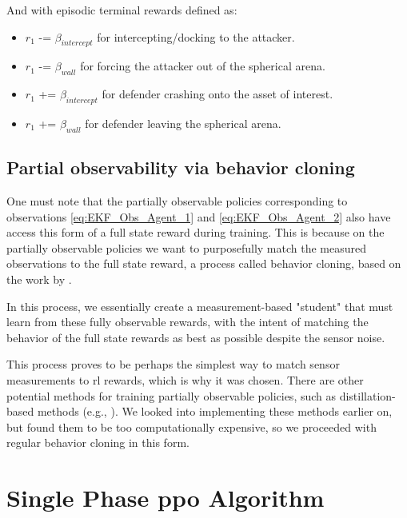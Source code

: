 And with episodic terminal rewards defined as:

\begin{itemize}
    \item $r_1$ -= $\beta_{intercept}$ for intercepting/docking to the attacker.
    \item $r_1$ -= $\beta_{wall}$ for forcing the attacker out of the spherical arena.
    \item $r_1$ += $\beta_{intercept}$ for defender crashing onto the asset of interest.
    \item $r_1$ += $\beta_{wall}$ for defender leaving the spherical arena.
    
\end{itemize}

\subsection{Partial observability via behavior cloning}
\label{subsec:partial-observability-behavior-cloning}

One must note that the partially observable policies corresponding to observations \ref{eq:EKF_Obs_Agent_1} and \ref{eq:EKF_Obs_Agent_2} also have access this form of a full state reward during training. This is because on the partially observable policies we want to purposefully match the measured observations to the full state reward, a process called behavior cloning, based on the work by \cite{ross2011reduction}.

In this process, we essentially create a measurement-based "student" that must learn from these fully observable rewards, with the intent of matching the behavior of the full state rewards as best as possible despite the sensor noise.

This process proves to be perhaps the simplest way to match sensor measurements to \acs{rl} rewards, which is why it was chosen. There are other potential methods for training partially observable policies, such as distillation-based methods (e.g., \cite{bajcsy2024learning}). We looked into implementing these methods earlier on, but found them to be too computationally expensive, so we proceeded with regular behavior cloning in this form.



\section{Single Phase \acs{ppo} Algorithm}
\label{sec:single-phase-ppo}

